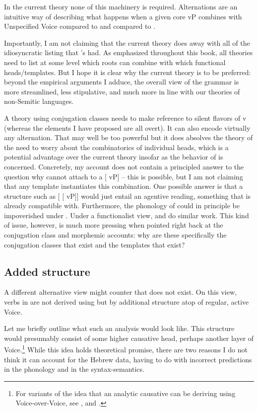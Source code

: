 In the current theory none of this machinery is required. Alternations are an intuitive way of describing what happens when a given core vP combines with Unspecified Voice compared to {\vz} and compared to {\vd}.

Importantly, I am not claiming that the current theory does away with all of the idiosyncratic listing that \citeauthor{arad05}'s had. As emphasized throughout this book, all theories need to list at some level which roots can combine with which functional heads/templates. But I hope it is clear why the current theory is to be preferred: beyond the empirical arguments I adduce, the overall view of the grammar is more streamlined, less stipulative, and much more in line with our theories of non-Semitic languages.

A theory using conjugation classes needs to make reference to silent flavors of v (whereas the elements I have proposed are all overt). It can also encode virtually any alternation. That may well be too powerful but it does absolves the theory of the need to worry about the combinatorics of individual heads, which is a potential advantage over the current theory insofar as the behavior of {\vd} is concerned. Concretely, my account does not contain a principled answer to the question why {\vd} cannot attach to a [{\va} vP] -- this is possible, but I am not claiming that any template instantiates this combination. One possible answer is that a structure such as [{\vd} [{\va} vP]] would just entail an agentive reading, something that {\vd} is already compatible with. Furthermore, the phonology of {\va} could in principle be impoverished under {\vd}. Under a functionalist view, {\va} and {\vd} do similar work. This kind of issue, however, is much more pressing when pointed right back at the conjugation class and morphemic accounts: why are these specifically the conjugation classes that exist and the templates that exist?

	\subsection{Added structure} \label{vd:others:struct}
A different alternative view might counter that {\vd} does not exist. On this view, verbs in {\thif} are not derived using {\vd} but by additional structure atop of regular, active Voice.

Let me briefly outline what such an analysis would look like. This structure would presumably consist of some higher causative head, perhaps another layer of Voice.\footnote{For variants of the idea that an analytic causative can be deriving using Voice-over-Voice, see \cite{tubinoblanco11}, \cite{harley13lingua,harley17oup} and \cite{nie19}.} While this idea holds theoretical promise, there are two reasons I do not think it can account for the Hebrew data, having to do with incorrect predictions in the phonology and in the syntax-semantics.

